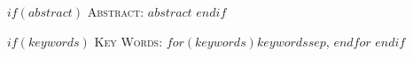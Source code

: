 \maketitle

$if(abstract)$
{\small\noindent\textsc{Abstract}: $abstract$}
\smallskip
$endif$

$if(keywords)$
\noindent\textsc{Key Words}: $for(keywords)$$keywords$$sep$, $endfor$
$endif$
